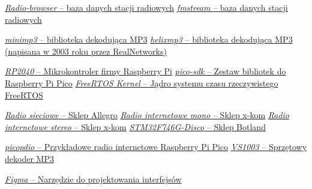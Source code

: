 \documentclass[12pt]{report}
\begin{document}
	\pagebreak
	\begin{thebibliography}{9}
		\href{https://www.radio-browser.info/}{\textit{Radio-browser} -- baza danych stacji radiowych}
		\href{http://fmstream.org}{\textit{fmstream} -- baza danych stacji radiowych}
		
		\href{https://github.com/lieff/minimp3}{\textit{minimp3} -- biblioteka dekodująca MP3}
		\href{https://realnetworks.com}{\textit{helixmp3} -- biblioteka dekodująca MP3 (napisana w 2003 roku przez RealNetworks)}
		
		\href{https://www.raspberrypi.com/documentation/microcontrollers/rp2040.html}{\textit{RP2040} -- Mikrokontroler firmy Raspberry Pi}
		\href{https://github.com/raspberrypi/pico-sdk}{\textit{pico-sdk} -- Zestaw bibliotek do Raspberry Pi Pico}
		\href{https://github.com/FreeRTOS/FreeRTOS-Kernel}{\textit{FreeRTOS Kernel} -- Jądro systemu czasu rzeczywistego FreeRTOS}
		
		\href{https://allegro.pl/oferta/adapter-radia-internetowego-dual-ir-3a-dab-fm-rds-12692108793}{\textit{Radio sieciowe} -- Sklep Allegro}
		\href{https://www.x-kom.pl/p/653480-radio-internetowe-technisat-sternradio-ir-2-biale.html}{\textit{Radio internetowe mono} -- Sklep x-kom}
		\href{https://www.x-kom.pl/p/724674-radio-internetowe-blaupunkt-ir10bt.html}{\textit{Radio internetowe stereo} -- Sklep x-kom}
		\href{https://botland.com.pl/stm32-discovery/4715-stm32f746g-disco-discovery-stm32f746ng-cortex-m7-ekran-dotykowy-pojemnosciowy-43--5904422374082.html}{\textit{STM32F746G-Disco} -- Sklep Botland}
		
		\href{https://github.com/episource/picopdio}{\textit{picopdio} -- Przykładowe radio internetowe Raspberry Pi Pico}
		\href{https://botland.com.pl/odtwarzacze-mp3-wav-ogg-midi/14308-odtwarzacz-mp3-vs1003-z-mikrofonem-5903351241786.html}{\textit{VS1003} -- Sprzętowy dekoder MP3}
		
		\href{https://www.figma.com}{\textit{Figma} -- Narzędzie do projektowania interfejsów}
		
	\end{thebibliography}
	
\end{document}

